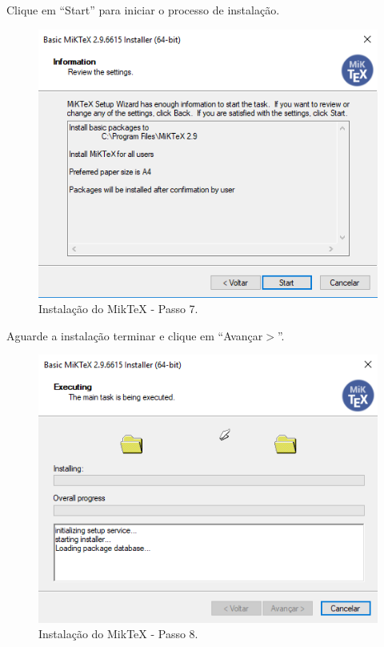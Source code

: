 \newpage
Clique em “Start” para iniciar o processo de instalação.\\

\begin{figure}[htb]
  \begin{center}
    \includegraphics[scale=0.7]{imagens/miktex/miktex7.png}
  \end{center}
  \caption{Instalação do MikTeX - Passo 7.}
  \label{mt7}
\end{figure}

Aguarde a instalação terminar e clique em “Avançar$>$”.\\

\begin{figure}[htb]
  \begin{center}
    \includegraphics[scale=0.7]{imagens/miktex/miktex8.png}
  \end{center}
  \caption{Instalação do MikTeX - Passo 8.}
  \label{mt8}
\end{figure}

